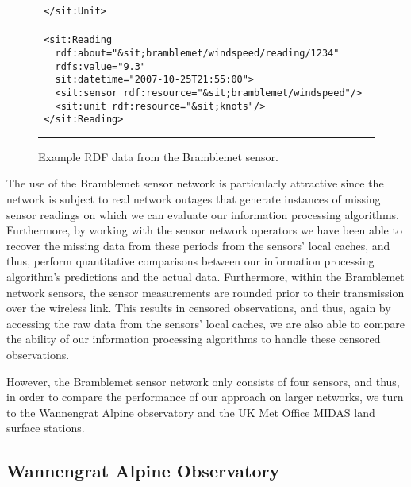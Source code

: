 \documentclass{acmsmall}
\begin{document}
\begin{figure}
\begin{minipage}{2.6in}
\begin{tabbing}
\tt\scriptsize \ </\color{red}sit:Unit\color{black}>\\
\\
\tt\scriptsize \ <\color{red}sit:Reading\color{black}\\
\tt\scriptsize \ \ \ rdf:about=\color{blue}"\&sit;bramblemet/windspeed/reading/1234"\color{black}\\
\tt\scriptsize \ \ \ rdfs:value=\color{blue}"9.3"\color{black}\\
\tt\scriptsize \ \ \ sit:datetime=\color{blue}"2007-10-25T21:55:00"\color{black}>\\
\tt\scriptsize \ \ \ <\color{red}sit:sensor\color{black}~rdf:resource=\color{blue}"\&sit;bramblemet/windspeed"\color{black}/>\\
\tt\scriptsize \ \ \ <\color{red}sit:unit\color{black}~rdf:resource=\color{blue}"\&sit;knots"\color{black}/>\\
\tt\scriptsize \ </\color{red}sit:Reading\color{black}>\\
\normalsize
\end{tabbing}
\end{minipage}\par
\rule{3.3in}{.005in} 
\caption{Example RDF data from the Bramblemet sensor.}
\label{rdf}
\end{figure}

The use of the Bramblemet sensor network is particularly attractive since the network is subject to real network outages that generate instances of missing sensor readings on which we can evaluate our information processing algorithms. Furthermore, by working with the sensor network operators we have been able to recover the missing data from these periods from the sensors' local caches, and thus, perform quantitative comparisons between our information processing algorithm's predictions and the actual data. Furthermore, within the Bramblemet network sensors, the sensor measurements are rounded prior to their transmission over the wireless link. This results in censored observations, and thus, again by accessing the raw data from the sensors' local caches, we are also able to compare the ability of our information processing algorithms to handle these censored observations.

However, the Bramblemet sensor network only consists of four sensors, and thus, in order to compare the performance of our approach on larger networks, we turn to the Wannengrat Alpine observatory and the UK Met Office MIDAS land surface stations.

\subsection{Wannengrat Alpine Observatory}
\end{document}
